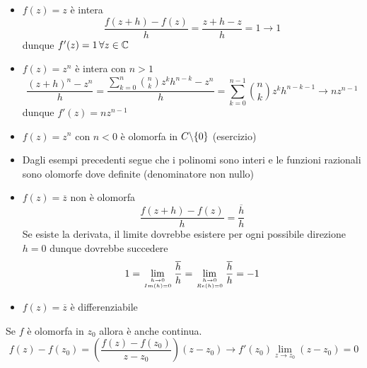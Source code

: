 \begin{ese}\bbianco
\begin{itemize}
\item $f(z)=z$ \`e intera
$$\frac{f(z+h)-f(z)}{h}=\frac{z+h-z}{h}=1 \to 1 $$
dunque $f'(z)=1 \, \forall z\in \mathbb{C}$
\item $f(z)=z^n$ \`e intera con $n>1$
$$ \frac{(z+h)^n - z^n}{h}= \frac{\sum_{k=0}^n {n\choose k} z^k h^{n-k} -z^n }{h} = \sum_{k=0}^{n-1}{n\choose k} z^k h^{n-k-1} \to n z^{n-1}$$
dunque $f'(z)= n z^{n-1}$
\item $f(z)=z^n $ con $n<0$ \`e olomorfa in $C\backslash \{0\}$ (esercizio)
\item Dagli esempi precedenti segue che i polinomi sono interi e le funzioni razionali sono olomorfe dove definite (denominatore non nullo)
\item $f(z)=\overline{z}$ non \`e olomorfa\\
$$ \frac{f(z+h) - f(z)}{h}=\frac{\overline{h}}{h}$$
Se esiste la derivata, il limite dovrebbe esistere per ogni possibile direzione $h=0$ dunque dovrebbe succedere
$$ 1 = \lim_{h \to 0 \atop{Im(h) = 0}} \frac{\overline{h}}{h} = \lim_{h \to 0 \atop{Re (h)=0}}\frac{\overline{h}}{h}=-1$$
\item $f(z)=\overline{z}$ \`e differenziabile
\end{itemize}
\end{ese}
\begin{oss}Se $f$ \`e olomorfa in $z_0$ allora \`e anche continua.
$$ f(z)-f(z_0)= \left( \frac{f(z)-f(z_0)}{z-z_0}\right) (z-z_0) \to f'(z_0) \lim_{z\to z_0} (z-z_0)= 0$$
\end{oss}

